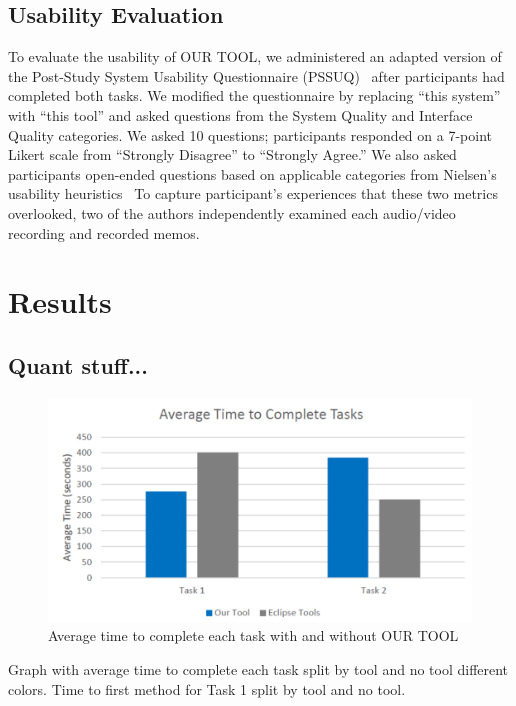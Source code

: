 \documentclass[conference]{IEEEtran}
\newcommand{\toolName}{OUR TOOL}
\begin{document}
\subsection{Usability Evaluation}
To evaluate the usability of \toolName, we administered an adapted version of the Post-Study System Usability Questionnaire (PSSUQ)~\cite{Lewis95ibmcomputer} after participants had completed both tasks. We modified the questionnaire by replacing ``this system'' with ``this tool'' and asked questions from the System Quality and Interface Quality categories. We asked 10 questions; participants responded on a 7-point Likert scale from ``Strongly Disagree'' to ``Strongly Agree.'' 	
We also asked participants open-ended questions based on applicable categories from Nielsen's usability heuristics~\cite{Nielsen1992}
To capture participant's experiences that these two metrics overlooked, two of the authors independently examined each audio/video recording and recorded memos. 

\section{Results}
\subsection{Quant stuff...}


\begin{figure}
	\centering
	\includegraphics[width=\columnwidth]{images/taskTime}
	\caption{Average time to complete each task with and without \toolName}
	\label{fig:taskTime} 
\end{figure}

Graph with average time to complete each task split by tool and no tool different colors.
Time to first method for Task 1 split by tool and no tool.
\end{document}

